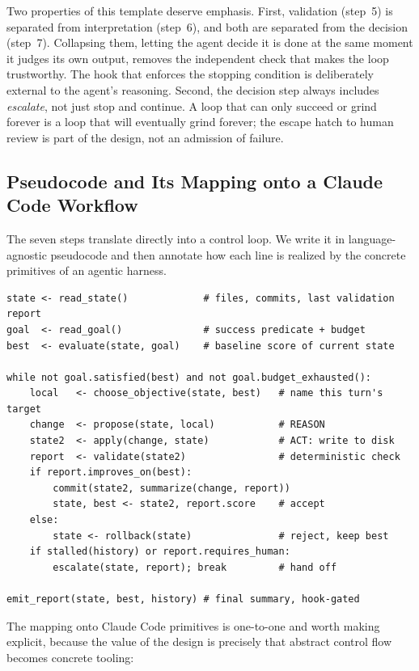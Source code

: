 Two properties of this template deserve emphasis. First, validation (step~5) is
separated from interpretation (step~6), and both are separated from the decision
(step~7). Collapsing them, letting the agent decide it is done at the same
moment it judges its own output, removes the independent check that makes the
loop trustworthy. The hook that enforces the stopping condition is deliberately
external to the agent's reasoning. Second, the decision step always includes
\emph{escalate}, not just stop and continue. A loop that can only succeed or grind
forever is a loop that will eventually grind forever; the escape hatch to human
review is part of the design, not an admission of failure.

\subsection{Pseudocode and Its Mapping onto a Claude Code Workflow}\label{subsec:loop-pseudocode}

The seven steps translate directly into a control loop. We write it in
language-agnostic pseudocode and then annotate how each line is realized by the
concrete primitives of an agentic harness.

\begin{verbatim}
state <- read_state()             # files, commits, last validation report
goal  <- read_goal()              # success predicate + budget
best  <- evaluate(state, goal)    # baseline score of current state

while not goal.satisfied(best) and not goal.budget_exhausted():
    local   <- choose_objective(state, best)   # name this turn's target
    change  <- propose(state, local)           # REASON
    state2  <- apply(change, state)            # ACT: write to disk
    report  <- validate(state2)                # deterministic check
    if report.improves_on(best):
        commit(state2, summarize(change, report))
        state, best <- state2, report.score    # accept
    else:
        state <- rollback(state)               # reject, keep best
    if stalled(history) or report.requires_human:
        escalate(state, report); break         # hand off

emit_report(state, best, history) # final summary, hook-gated
\end{verbatim}

The mapping onto Claude Code primitives is one-to-one and worth making explicit,
because the value of the design is precisely that abstract control flow becomes
concrete tooling:


